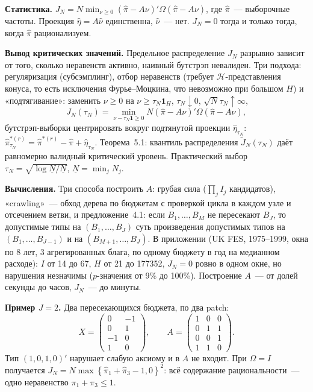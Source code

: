 \documentclass[a4paper,11pt]{article}
\theoremstyle{plain}
\theoremstyle{definition}
\theoremstyle{remark}
\newcommand{\set}[1]{\left\{ #1 \right\}}
\begin{document}
\textbf{Статистика.} $J_N=N\min_{\nu\ge0}(\hat\pi-A\nu)'\Omega(\hat\pi-A\nu)$, где $\hat\pi$~--- выборочные частоты. Проекция $\hat\eta=A\hat\nu$ единственна, $\hat\nu$~--- нет. $J_N=0$ тогда и только тогда, когда $\hat\pi$ рационализуем.

\textbf{Вывод критических значений.} Предельное распределение $J_N$ разрывно зависит от того, сколько неравенств активно, наивный бутстрэп невалиден. Три подхода: регуляризация (субсэмплинг), отбор неравенств (требует $\mathcal H$-представления конуса, то есть исключения Фурье--Моцкина, что невозможно при большом $H$) и «подтягивание»: заменить $\nu\ge0$ на $\nu\ge\tau_N\mathbf 1_H$, $\tau_N\downarrow0$, $\sqrt N\tau_N\uparrow\infty$,
\[
    J_N(\tau_N)=\min_{\nu-\tau_N\mathbf 1\ge0}N(\hat\pi-A\nu)'\Omega(\hat\pi-A\nu),
\]
бутстрэп-выборки центрировать вокруг подтянутой проекции $\hat\eta_{\tau_N}$: $\hat\pi^{*(r)}_{\tau_N}=\hat\pi^{*(r)}-\hat\pi+\hat\eta_{\tau_N}$. Теорема~5.1: квантиль распределения $\tilde J_N(\tau_N)$ даёт равномерно валидный критический уровень. Практический выбор $\tau_N=\sqrt{\log\underline N/\underline N}$, $\underline N=\min_jN_j$.

\textbf{Вычисления.} Три способа построить $A$: грубая сила ($\prod_jI_j$ кандидатов), «crawling»~--- обход дерева по бюджетам с проверкой цикла в каждом узле и отсечением ветви, и предложение~4.1: если $B_1,\dots,B_M$ не пересекают $B_J$, то допустимые типы на $(B_1,\dots,B_J)$ суть произведения допустимых типов на $(B_1,\dots,B_{J-1})$ и на $(B_{M+1},\dots,B_J)$. В приложении (UK FES, 1975--1999, окна по 8 лет, 3 агрегированных блага, по одному бюджету в год на медианном расходе): $I$ от 14 до 67, $H$ от 21 до 177352, $J_N=0$ ровно в одном окне, но нарушения незначимы ($p$-значения от 9\% до 100\%). Построение $A$~--- от долей секунды до часов, $J_N$~--- до минуты.

\textbf{Пример $J=2$.} Два пересекающихся бюджета, по два patch:
\[
    X=\begin{pmatrix}0&-1\\0&1\\-1&0\\1&0\end{pmatrix},\qquad
    A=\begin{pmatrix}1&0&0\\0&1&1\\0&0&1\\1&1&0\end{pmatrix}.
\]
Тип $(1,0,1,0)'$ нарушает слабую аксиому и в $A$ не входит. При $\Omega=I$ получается $J_N=N\max\set{\hat\pi_1+\hat\pi_3-1,0}^2$: всё содержание рациональности~--- одно неравенство $\pi_1+\pi_3\le1$.
\end{document}
